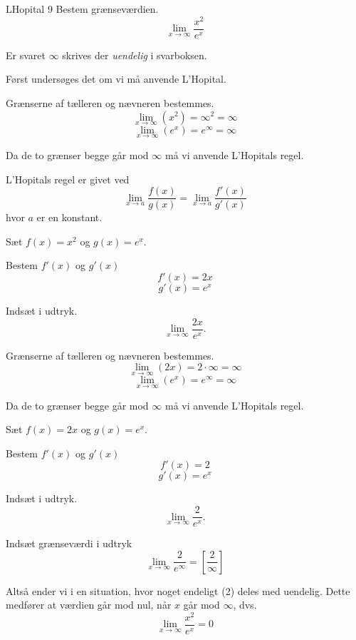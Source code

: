 \documentclass{article}
\begin{document}
\begin{exercise}{LHopital 9}
Bestem grænseværdien.
\[
\lim_{x \to \infty} \frac{x^2}{e^x}
\]

Er svaret $\infty$ skrives der \emph{uendelig} i svarboksen.


\hint
Først undersøges det om vi må anvende L'Hopital.

\hint
Grænserne af tælleren og nævneren bestemmes.
\[
\lim_{x \to \infty} (x^2) = \infty ^2 = \infty
\]
\[
\lim_{x \to \infty} (e^x) = e^\infty = \infty
\]

\hint
Da de to grænser begge går mod $\infty$ må vi anvende L'Hopitals regel.

\hint
L'Hopitals regel er givet ved
\[
\lim_{x \to a} \frac{f(x)}{g(x)} = \lim_{x \to a} \frac{f'(x)}{g'(x)}
\]
hvor $a$ er en konstant.

\hint
Sæt $f(x) = x^2$ og $g(x) = e^x$.

\hint
Bestem $f'(x)$ og $g'(x)$
\[
f'(x) = 2x
\]
\[
g'(x) = e^x
\]

\hint
Indsæt i udtryk.
\[
\lim_{x \to \infty} \frac{2x}{e^x}.
\]

\hint
Grænserne af tælleren og nævneren bestemmes.
\[
\lim_{x \to \infty} (2x) = 2 \cdot \infty = \infty
\]
\[
\lim_{x \to \infty} (e^x) = e^\infty = \infty
\]

\hint
Da de to grænser begge går mod $\infty$ må vi anvende L'Hopitals regel.

\hint
Sæt $f(x) = 2x$ og $g(x) = e^x$.

\hint
Bestem $f'(x)$ og $g'(x)$
\[
f'(x) = 2
\]
\[
g'(x) = e^x
\]

\hint
Indsæt i udtryk.
\[
\lim_{x \to \infty} \frac{2}{e^x}.
\]


\hint
Indsæt grænseværdi i udtryk
\[
\lim_{x \to \infty} \frac{2}{e^\infty} = \left[ \frac{2}{\infty} \right]
\]

\hint
Altså ender vi i en situation, hvor noget endeligt (2) deles med uendelig. Dette medfører at værdien går mod nul, når $x$ går mod $\infty$, dvs.
\[
\lim_{x \to \infty} \frac{x^2}{e^x} = 0
\]

\end{exercise}
\end{document}
